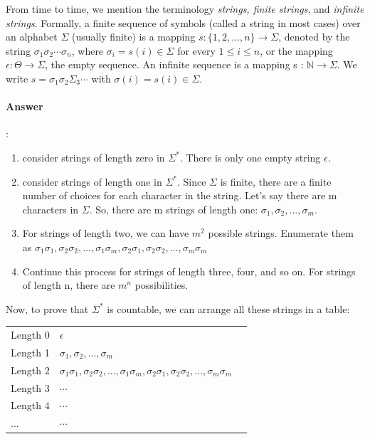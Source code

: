 \documentclass{article}
\begin{document}
\begin{tcolorbox}
  From time to time, we mention the terminology \textit{strings, finite strings}, and \textit{infinite strings}. Formally, a finite sequence of symbols (called a string in most cases) over an alphabet $\Sigma$ (usually finite) is a mapping $s : \{1, 2, . . . , n\} \to \Sigma$, denoted by the string $\sigma_1 \sigma_2 \cdots \sigma_n $, where $\sigma_i = s(i) \in \Sigma$ for every $1 \leq i \leq n$, or the mapping $\epsilon :\Theta \to \Sigma$, the empty sequence. An infinite sequence is a mapping s : $\mathbb{N} \to \Sigma$. We write $s = \sigma_1 \sigma_2 \Sigma_3 \cdots$ with $\sigma(i)=s(i) \in \Sigma$.
\end{tcolorbox}

\paragraph{Answer}:

\begin{enumerate}
  \item consider strings of length zero in $\Sigma^*$. There is only one empty string $\epsilon$.
  \item consider strings of length one in $\Sigma^*$. Since $\Sigma$ is finite, there are a finite number of choices for each character in the string. Let's say there are m characters in $\Sigma$. So, there are m strings of length one: $\sigma_1, \sigma_2, ..., \sigma_m$.
  \item For strings of length two, we can have $m^2$ possible strings. Enumerate them as $\sigma_1\sigma_1, \sigma_2\sigma_2, ..., \sigma_1\sigma_m, \sigma_2\sigma_1, \sigma_2\sigma_2, ..., \sigma_m\sigma_m$
  \item Continue this process for strings of length three, four, and so on. For strings of length n, there are $m^n$ possibilities.
\end{enumerate}

Now, to prove that $\Sigma^*$ is countable, we can arrange all these strings in a table:

\begin{table}[h!]
  \begin{center}
    \begin{tabular}{l|l|r}
      Length 0 & $\epsilon$ \\
      Length 1 & $\sigma_1, \sigma_2, ..., \sigma_m$ \\
      Length 2 & $\sigma_1\sigma_1, \sigma_2\sigma_2, ..., \sigma_1\sigma_m, \sigma_2\sigma_1, \sigma_2\sigma_2, ..., \sigma_m\sigma_m$ \\
      Length 3 & $\cdots$ \\
      Length 4 & $\cdots$ \\
      ... & $\cdots$ \\
    \end{tabular}    
  \end{center}
\end{table}
\end{document}
